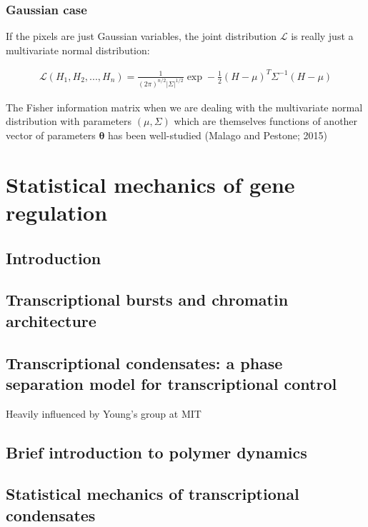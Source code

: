 \documentclass{ucetd}
\begin{document}
\subsection{Gaussian case}
If the pixels are just Gaussian variables, the joint distribution $\mathcal{L}$ is really just a multivariate normal distribution:

\begin{align*}
\mathcal{L}(H_{1},H_{2},...,H_{n}) = \frac{1}{(2\pi)^{n/2}|\Sigma|^{1/2}}\exp-\frac{1}{2}(H-\mu)^{T}\Sigma^{-1}(H-\mu)
\end{align*}

The Fisher information matrix when we are dealing with the multivariate normal distribution with parameters $(\mu,\Sigma)$ which are themselves functions of another vector of parameters $\bm{\theta}$ has been well-studied (Malago and Pestone; 2015)









\chapter{Statistical mechanics of gene regulation}

\section{Introduction}

\section{Transcriptional bursts and chromatin architecture}

\section{Transcriptional condensates: a phase separation model for transcriptional control}

Heavily influenced by Young's group at MIT


\section{Brief introduction to polymer dynamics}

\section{Statistical mechanics of transcriptional condensates}
\end{document}
